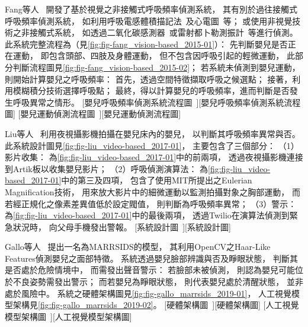 \documentclass[class=NCU_thesis, crop=false]{standalone}
\begin{document}
Fang等人~\cite{fang_vision-based_2015}
開發了基於視覺之非接觸式呼吸頻率偵測系統，
其有別於過往接觸式呼吸頻率偵測系統，
如利用呼吸電感體積描記法~\cite{mack_development_2009}及心電圖~\cite{berset_robust_2012}等；
或使用非視覺技術之非接觸式系統，
如透過二氧化碳感測器~\cite{cao_non-invasive_2007}或雷射都卜勒測振計~\cite{scalise_measurement_2011}等進行偵測。
此系統完整流程為（見\cref{fig:fig-fang_vision-based_2015-01}）：
先判斷嬰兒是否正在運動，
即包含頭部、四肢及身體運動，
但不包含因呼吸引起的輕微運動，
此部分判斷流程圖見\cref{fig:fig-fang_vision-based_2015-02}；
若系統未偵測到嬰兒運動，
則開始計算嬰兒之呼吸頻率：
首先，透過空間特徵擷取呼吸之候選點；
接著，利用模糊積分技術選擇呼吸點；
最終，得以計算嬰兒的呼吸頻率，進而判斷是否發生呼吸異常之情形。
[嬰兒呼吸頻率偵測系統流程圖~\cite{fang_vision-based_2015}][嬰兒呼吸頻率偵測系統流程圖]
[嬰兒運動偵測流程圖~\cite{fang_vision-based_2015}][嬰兒運動偵測流程圖]

Liu等人~\cite{liu_video-based_2017}
利用夜視攝影機拍攝在嬰兒床內的嬰兒，
以判斷其呼吸頻率異常與否。
此系統設計圖見\cref{fig:fig-liu_video-based_2017-01}，
主要包含了三個部分：
（1）影片收集：
為\cref{fig:fig-liu_video-based_2017-01}中的前兩項，
透過夜視攝影機連接到Artik板以收集嬰兒影片；
（2）呼吸偵測演算法：
為\cref{fig:fig-liu_video-based_2017-01}中的第三及四項，
包含了使用MIT所提出之Eulerian Magnification技術，
用來放大影片中的細微運動以監測拍攝對象之胸部運動，
而若經正規化之像素差異值低於設定閥值，
則判斷為呼吸頻率異常；
（3）警示：
為\cref{fig:fig-liu_video-based_2017-01}中的最後兩項，
透過Twilio在演算法偵測到緊急狀況時，
向父母手機發出警報。
[系統設計圖~\cite{liu_video-based_2017}][系統設計圖]

Gallo等人~\cite{gallo_marrsids_2019}
提出一名為MARRSIDS的模型，
其利用OpenCV之Haar-Like Features偵測嬰兒之面部特徵。
系統透過嬰兒臉部辨識與否及睜眼狀態，
判斷其是否處於危險情境中，
而需發出聲音警示：
若臉部未被偵測，
則認為嬰兒可能位於不良姿勢需發出警示；
而若嬰兒為睜眼狀態，
則代表嬰兒處於清醒狀態，
並非處於風險中。
系統之硬體架構圖見\cref{fig:fig-gallo_marrsids_2019-01}，
人工視覺模型架構見\cref{fig:fig-gallo_marrsids_2019-02}。
[硬體架構圖~\cite{gallo_marrsids_2019}][硬體架構圖]
[人工視覺模型架構圖~\cite{gallo_marrsids_2019}][人工視覺模型架構圖]
\end{document}
